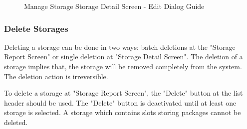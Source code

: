 \begin{figure}[H]
	\centering
    \vspace{5pt}
    \vspace{5pt}
    
    \caption{Manage Storage Storage Detail Screen - Edit Dialog Guide}
	\label{fig:MSDetailEditBtn}
\end{figure}

\subsubsection{Delete Storages}

Deleting a storage can be done in two ways: batch deletions at the "Storage Report Screen" or single deletion at "Storage Detail Screen". 
The deletion of a storage implies that, the storage will be removed completely from the system. The deletion action is irreversible. 

To delete a storage at "Storage Report Screen", the "Delete" button at the list header should be used. The "Delete" button is deactivated until at least one storage is selected. A storage which contains slots storing packages cannot be deleted.

